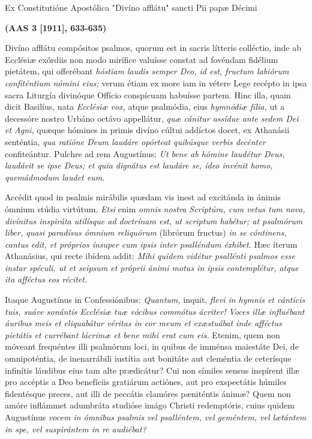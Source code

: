 \documentclass[options]{article}
\begin{document}
	Ex Constitutióne Apostólica "Divíno afflátu" sancti Pii papæ Décimi 
	
	\textbf{(AAS 3 [1911], 633-635)}
	
Divíno afflátu compósitos psalmos, quorum est in sacris lítteris colléctio, inde ab Ecclésiæ exórdiis non modo mirífice valuísse constat ad fovéndam fidélium pietátem, qui offerébant 
	\textit{hóstiam laudis semper Deo, id est, fructum labiórum confiténtium nómini eius;}
 verum étiam ex more iam in vétere Lege recépto in ipsa sacra Liturgía divinóque Offício conspícuam habuísse partem. Hinc illa, quam dicit Basilíus, nata  
	\textit{Ecclésiæ vox,}
atque psalmódia, eius 
	\textit{hymnódiæ fília,}
ut a decessóre nostro Urbáno octávo appellátur, 
	\textit{quæ cánitur assídue ante sedem Dei et Agni,}
quæque hómines in primis divíno cúltui addíctos docet, ex Athanásii senténtia, 
	\textit{qua ratióne Deum laudáre opórteat quibúsque verbis decénter}
confiteántur. Pulchre ad rem Augustínus: 
	\textit{Ut bene ab hómine laudétur Deus, laudávit se ipse Deus; et quia dignátus est laudáre se, ídeo invénit homo, quemádmodum laudet eum.}
	
	 	Accédit quod in psalmis mirábilis quædam vis inest ad excitánda in ánimis ómnium stúdia virtútum. 
	\textit{Etsi}
enim 
	\textit{omnis nostra Scriptúra, cum vetus tum nova, divínitus inspiráta utilísque ad doctrínam est, ut scriptum habétur; at psalmórum liber, quasi paradísus ómnium reliquórum } 
	(librórum fructus) 
	\textit{in se cóntinens, cantus edit, et próprios ínsuper cum ipsis inter psalléndum éxhibet.}
Hæc íterum Athanásius, qui recte ibídem addit: 
	\textit{Mihi quidem vidétur psallénti psalmos esse instar spéculi, ut et seípsum et próprii ánimi motus in ipsis contemplétur, atque ita afféctus eos récitet.}
	
		Itaque Augustínus in Confessiónibus:
	\textit{Quantum,}
inquit,
	\textit{flevi in hymnis et cánticis tuis, suáve sonántis Ecclésiæ tuæ vócibus commótus ácriter! Voces illæ influébant áuribus meis et eliquabátur véritas in cor meum et exæstuábat inde afféctus pietátis et currébant lácrimæ et bene mihi erat cum eis.}
	Etenim, quem non móveant frequéntes illi psalmórum loci, in quibus de imménsa maiestáte Dei, de omnipoténtia, de inenarrábili iustítia aut bonitáte aut cleméntia de ceterísque infinítis láudibus eius tam alte prædicátur? Cui non símiles sensus inspírent illæ pro accéptis a Deo benefíciis gratiárum actiónes, aut pro exspectátis húmiles fidentésque preces, aut illi de peccátis clamóres pæniténtis ánimæ? Quem non amóre inflámmet adumbráta studióse imágo Christi redemptóris, cuius quidem Augustínus
	\textit{vocem in ómnibus psalmis vel psalléntem, vel geméntem, vel lætántem in spe, vel suspirántem in re audiébat?}
	
\end{document}
